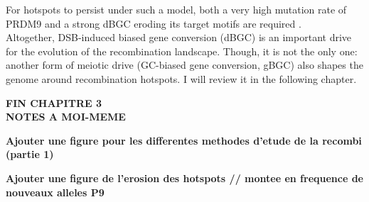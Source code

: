 For hotspots to persist under such a model, both a very high mutation rate of PRDM9 and a strong dBGC eroding its target motifs are required \citep{latrille2017red}.\\



Altogether, DSB-induced biased gene conversion (dBGC) is an important drive for the evolution of the recombination landscape.
Though, it is not the only one: another form of meiotic drive (GC-biased gene conversion, gBGC) also shapes the genome around recombination hotspots. 
I will review it in the following chapter.

\textbf{FIN CHAPITRE 3}\\



\textbf{NOTES A MOI-MEME} 

\textbf{Ajouter une figure pour les differentes methodes d'etude de la recombi (partie 1)}

\textbf{Ajouter une figure de l'erosion des hotspots // montee en frequence de nouveaux alleles P9}




%















